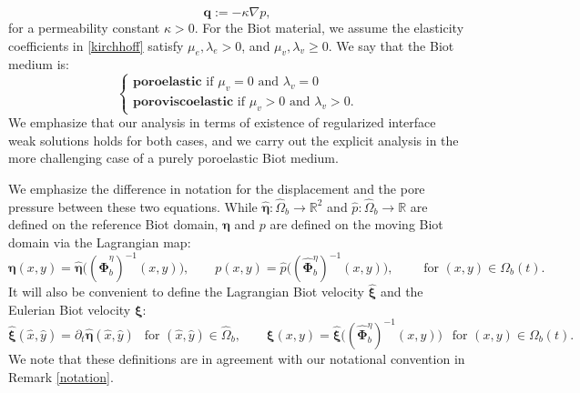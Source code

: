 \documentclass[11pt]{article}
\newcommand{\bd}{\boldsymbol}
\def\R{{\mathbb R}}
\theoremstyle{definition}
\begin{document}
\begin{equation}\label{darcy}
\bd{q} := -\kappa \nabla p,
\end{equation}
for a permeability constant $\kappa > 0$. For the Biot material, we assume the elasticity coefficients in \eqref{kirchhoff} satisfy $\mu_{e}, \lambda_{e} > 0$, and $\mu_{v}, \lambda_{v} \ge 0$. We say that the Biot medium is:
\begin{equation}\label{poroviscoelastic}
\begin{cases}
\textbf{poroelastic} \text{ if } \mu_{v} = 0 \text{ and } \lambda_{v} = 0 \\
\textbf{poroviscoelastic} \text{ if } \mu_{v} > 0 \text{ and } \lambda_{v} > 0.
\end{cases}
\end{equation}
We emphasize that our analysis in terms of existence of regularized interface weak solutions holds for both cases, and we carry out the explicit analysis in the more challenging case of a purely poroelastic Biot medium.

We emphasize the difference in notation for the displacement and the pore pressure between these two equations. While $\hat{\bd{\eta}}: \hat{\Omega}_{b} \to \R^{2}$ and $\hat{p}: \hat{\Omega}_{b} \to \R$ are defined on the reference Biot domain, $\bd{\eta}$ and $p$ are defined on the moving Biot domain via the Lagrangian map:
\begin{equation*}
\bd{\eta}(x, y) = \hat{\bd{\eta}}\Big((\hat{\bd{\Phi}}^{\eta}_{b})^{-1}(x, y)\Big), \qquad p(x, y) = \hat{p}\Big((\hat{\bd{\Phi}}^{\eta}_{b})^{-1}(x, y)\Big), \qquad \text{ for } (x, y) \in \Omega_{b}(t). 
\end{equation*}
It will also be convenient to define the Lagrangian Biot velocity $\hat{\bd{\xi}}$ and the Eulerian Biot velocity $\bd{\xi}$:
\begin{equation}\label{eulerianvelocity}
\hat{\bd{\xi}}(\hat{x}, \hat{y}) = \partial_{t}\hat{\bd{\eta}}(\hat{x}, \hat{y}) \ \ \text{ for } (\hat{x}, \hat{y}) \in \hat{\Omega}_{b}, \qquad \bd{\xi}(x, y) = \hat{\bd{\xi}}\Big((\hat{\bd{\Phi}}^{\eta}_{b})^{-1}(x, y)\Big) \ \  \text{ for } (x, y) \in \Omega_{b}(t).
\end{equation}
We note that these definitions are in agreement with our notational convention in Remark \ref{notation}.
\end{document}
